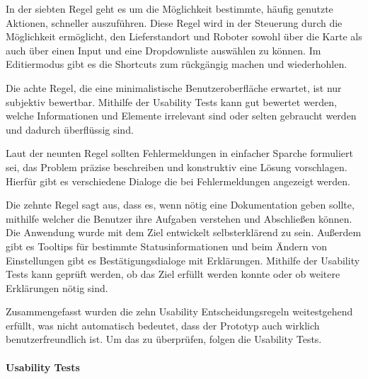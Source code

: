 In der siebten Regel geht es um die Möglichkeit bestimmte, häufig genutzte Aktionen, schneller auszuführen. Diese Regel wird in der Steuerung durch die Möglichkeit ermöglicht, den Lieferstandort und Roboter sowohl über die Karte als auch über einen Input und eine Dropdownliste auswählen zu können. Im Editiermodus gibt es die Shortcuts zum rückgängig machen und wiederhohlen.

Die achte Regel, die eine minimalistische Benutzeroberfläche erwartet, ist nur subjektiv bewertbar. Mithilfe der Usability Tests kann gut bewertet werden, welche Informationen und Elemente irrelevant sind oder selten gebraucht werden und dadurch überflüssig sind.

Laut der neunten Regel sollten Fehlermeldungen in einfacher Sparche formuliert sei, das Problem präzise beschreiben und konstruktiv eine Lösung vorschlagen. Hierfür gibt es verschiedene Dialoge die bei Fehlermeldungen angezeigt werden.

Die zehnte Regel sagt aus, dass es, wenn nötig eine Dokumentation geben sollte, mithilfe welcher die Benutzer ihre Aufgaben verstehen und Abschließen können. Die Anwendung wurde mit dem Ziel entwickelt selbsterklärend zu sein. 
Außerdem gibt es Tooltips für bestimmte Statusinformationen und beim Ändern von Einstellungen gibt es Bestätigungsdialoge mit Erklärungen. Mithilfe der Usability Tests kann geprüft werden, ob das Ziel erfüllt werden konnte oder ob weitere Erklärungen nötig sind.

Zusammengefasst wurden die zehn Usability Entscheidungsregeln weitestgehend erfüllt, was nicht automatisch bedeutet, dass der Prototyp auch wirklich benutzerfreundlich ist. Um das zu überprüfen, folgen die Usability Tests.

\paragraph{Usability Tests}


